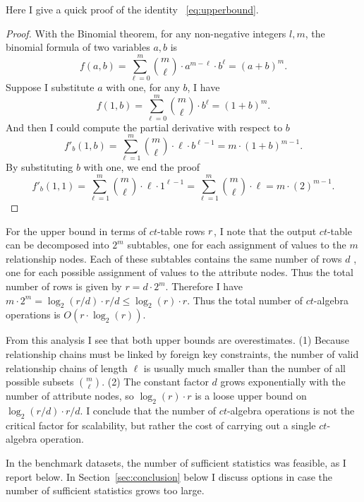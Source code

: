 \documentclass{sfuthesis}
\newcommand{\ct}{\mathit{ct}}
\begin{document}
Here I  give a quick proof of the identity ~\eqref{eq:upperbound}. 
\begin{proof}
With the Binomial theorem, for any non-negative integers $l,m$, the binomial formula of two variables $a,b$ is 
$$ f(a,b)=\sum_{\ell=0}^{m}\binom{m}{\ell} \cdot a^{m-\ell} \cdot b^\ell = (a+b)^m. $$
Suppose I  substitute $a$ with one, for any $b$, I  have 
$$
f(1,b)= \sum_{\ell=0}^m\binom{m}{\ell} \cdot b^\ell=(1+b)^m.
$$
And then I  could compute the partial derivative with respect to $b$
$$
f'_{b}(1,b)= \sum_{\ell=1}^m\binom{m}{\ell}\cdot \ell \cdot b^{\ell-1}=m \cdot (1+b)^{m-1}.$$
By substituting $b$ with one, we end the proof 
$$f'_{b}(1,1)=  \sum_{\ell=1}^m\binom{m}{\ell}\cdot \ell \cdot 1^{\ell-1}= \sum_{\ell=1}^m\binom{m}{\ell}\cdot \ell = m\cdot(2)^{m-1}.$$

\end{proof}

For the upper bound in terms of $\ct$-table rows $r$, I  note that the output $\ct$-table can be decomposed into $2^{m}$ subtables, one for each assignment of values to the $m$ relationship nodes. 
Each of these subtables contains the same number of rows $d$ , one for each possible assignment of values to the attribute nodes. 
Thus the total number of rows is given by $r = d \cdot 2^m.$ 
Therefore I  have 
$m \cdot 2^{m} = \log_{2} (r/d) \cdot r/d \leq \log_{2}(r) \cdot r.$
Thus the total number of $\ct$-algebra operations is $O(r \cdot \log_{2}(r))$.

From this analysis I  see that both upper bounds are overestimates. (1) Because relationship chains must be linked by foreign key constraints, the number of valid relationship chains of length $\ell$ is usually much smaller than the number of all possible subsets ${m\choose \ell}$. (2) The constant factor $d$ grows exponentially with the number of attribute nodes, so $\log_{2}(r) \cdot r$ is a loose upper bound on $\log_{2} (r/d) \cdot r/d$. 
I  conclude that the number of $\ct$-algebra operations is not the critical factor for scalability, but rather the cost of carrying out a single $\ct$-algebra operation. 

In the benchmark datasets, the number of sufficient statistics was feasible, as I  report below. 
In Section~\ref{sec:conclusion} below I  discuss options in case the number of sufficient statistics  grows too large.
\end{document}
